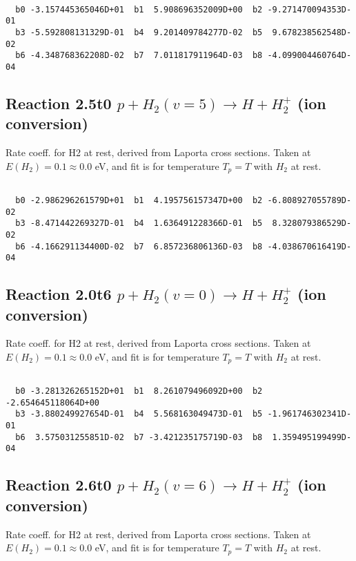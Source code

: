 \begin{small}\begin{verbatim}

  b0 -3.157445365046D+01  b1  5.908696352009D+00  b2 -9.271470094353D-01
  b3 -5.592808131329D-01  b4  9.201409784277D-02  b5  9.678238562548D-02
  b6 -4.348768362208D-02  b7  7.011817911964D-03  b8 -4.099004460764D-04

\end{verbatim}\end{small}

\newpage
\subsection{
Reaction 2.5t0
$ p + H_2(v=5) \rightarrow H + H_2^+$ (ion conversion)
}
Rate coeff. for H2 at rest, derived from Laporta cross sections.
Taken at $E(H_2) = 0.1 \approx 0.0$ eV,  and fit is for temperature $T_p=T$ with $H_2$ at rest.

\begin{small}\begin{verbatim}

  b0 -2.986296261579D+01  b1  4.195756157347D+00  b2 -6.808927055789D-02
  b3 -8.471442269327D-01  b4  1.636491228366D-01  b5  8.328079386529D-02
  b6 -4.166291134400D-02  b7  6.857236806136D-03  b8 -4.038670616419D-04

\end{verbatim}\end{small}

\newpage
\subsection{
Reaction 2.0t6
$ p + H_2(v=0) \rightarrow H + H_2^+$ (ion conversion)
}
Rate coeff. for H2 at rest, derived from Laporta cross sections.
Taken at $E(H_2) = 0.1 \approx 0.0$ eV,  and fit is for temperature $T_p=T$ with $H_2$ at rest.

\begin{small}\begin{verbatim}

  b0 -3.281326265152D+01  b1  8.261079496092D+00  b2 -2.654645118064D+00
  b3 -3.880249927654D-01  b4  5.568163049473D-01  b5 -1.961746302341D-01
  b6  3.575031255851D-02  b7 -3.421235175719D-03  b8  1.359495199499D-04

\end{verbatim}\end{small}

\newpage
\subsection{
Reaction 2.6t0
$ p + H_2(v=6) \rightarrow H + H_2^+$ (ion conversion)
}
Rate coeff. for H2 at rest, derived from Laporta cross sections.
Taken at $E(H_2) = 0.1 \approx 0.0$ eV,  and fit is for temperature $T_p=T$ with $H_2$ at rest.

